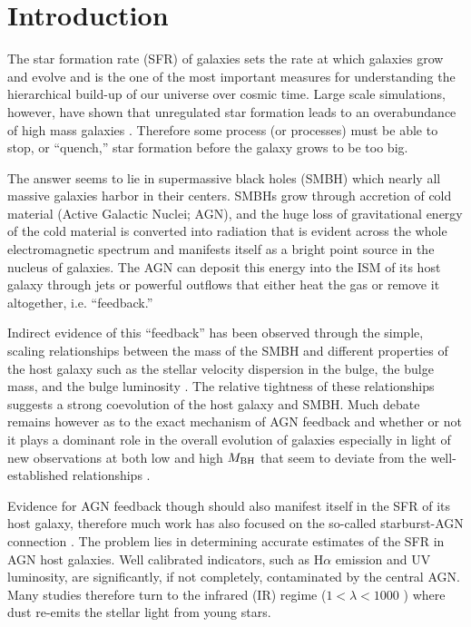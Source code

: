 \section{Introduction}\label{sec:intro}
The star formation rate (SFR) of galaxies sets the rate at which galaxies grow and evolve and is the one of the most important measures for understanding the hierarchical build-up of our universe over cosmic time. Large scale simulations, however, have shown that unregulated star formation leads to an overabundance of high mass galaxies \citep[e.g.][]{Bower:2006gf,Croton:2006kx,Silk:2012fj}. Therefore some process (or processes) must be able to stop, or ``quench,'' star formation before the galaxy grows to be too big.

The answer seems to lie in supermassive black holes (SMBH) which nearly all massive galaxies harbor in their centers. SMBHs grow through accretion of cold material (Active Galactic Nuclei; AGN), and the huge loss of gravitational energy of the cold material is converted into radiation that is evident across the whole electromagnetic spectrum and manifests itself as a bright point source in the nucleus of galaxies. The AGN can deposit this energy into the ISM of its host galaxy through jets \cite[e.g.][]{Fabian:2003ek,Best:2007vn,Lanz:2015bq} or powerful outflows \citep[e.g][]{Alatalo:2011lk,Veilleux:2013qq,Harrison:2014xe,Tombesi:2015fj} that either heat the gas or remove it altogether, i.e. ``feedback.''
  
Indirect evidence of this ``feedback'' has been observed through the simple, scaling relationships between the mass of the SMBH and different properties of the host galaxy such as the stellar velocity dispersion in the bulge, the bulge mass, and the bulge luminosity \citep[e.g.][]{Kormendy:1995mz,Ferrarese:2000gf,Marconi:2003ve,Haring:2004ly,Gultekin:2009ul,Kormendy:2013fj}. The relative tightness of these relationships suggests a strong coevolution of the host galaxy and SMBH. Much debate remains however as to the exact mechanism of AGN feedback and whether or not it plays a dominant role in the overall evolution of galaxies especially in light of new observations at both low and high $M_{\rm BH}$ that seem to deviate from the well-established relationships \citep[see][for a detailed review]{Kormendy:2013fj}. 

Evidence for AGN feedback though should also manifest itself in the SFR of its host galaxy, therefore much work has also focused on the so-called starburst-AGN connection \citep[e.g.][]{Sanders:1988fk,Cid-Fernandes:2001uq,Diamond-Stanic:2012rw,Dixon:2011yq,Rovilos:2012wd,Chen:2013uq,LaMassa:2013hb,Esquej:2014vl,Hickox:2014yq,Mushotzky:2014ad}. The problem lies in determining accurate estimates of the SFR in AGN host galaxies. Well calibrated indicators, such as H$\alpha$ emission and UV luminosity, are significantly, if not completely, contaminated by the central AGN. Many studies therefore turn to the infrared (IR) regime ($1<\lambda<1000$ \um) where dust re-emits the stellar light from young stars.

